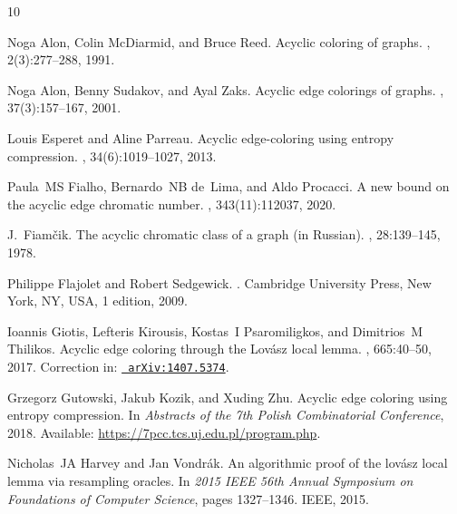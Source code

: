 \documentclass{amsart}
\theoremstyle{plain}
\begin{document}
%
%


\begin{thebibliography}{10}

Noga Alon, Colin McDiarmid, and Bruce Reed.
\newblock Acyclic coloring of graphs.
, 2(3):277--288, 1991.

Noga Alon, Benny Sudakov, and Ayal Zaks.
\newblock Acyclic edge colorings of graphs.
, 37(3):157--167, 2001.

Louis Esperet and Aline Parreau.
\newblock Acyclic edge-coloring using entropy compression.
, 34(6):1019--1027, 2013.

Paula~MS Fialho, Bernardo~NB de~Lima, and Aldo Procacci.
\newblock A new bound on the acyclic edge chromatic number.
, 343(11):112037, 2020.

J.~Fiam\v{c}ik.
\newblock The acyclic chromatic class of a graph (in {R}ussian).
, 28:139--145, 1978.

Philippe Flajolet and Robert Sedgewick.
.
\newblock Cambridge University Press, New York, NY, USA, 1 edition, 2009.

Ioannis Giotis, Lefteris Kirousis, Kostas~I Psaromiligkos, and Dimitrios~M
  Thilikos.
\newblock Acyclic edge coloring through the {L}ov{\'a}sz local lemma.
, 665:40--50, 2017.
\newblock Correction in: \href{http://arxiv.org/abs/1407.5374}{\tt
  arXiv:1407.5374}.

Grzegorz Gutowski, Jakub Kozik, and Xuding Zhu.
\newblock Acyclic edge coloring using entropy compression.
\newblock In {\em Abstracts of the 7th Polish Combinatorial Conference}, 2018.
\newblock Available:
  \href{https://7pcc.tcs.uj.edu.pl/program.php}{\url{https://7pcc.tcs.uj.edu.pl/program.php}}.

Nicholas~JA Harvey and Jan Vondr{\'a}k.
\newblock An algorithmic proof of the lov{\'a}sz local lemma via resampling
  oracles.
\newblock In {\em 2015 IEEE 56th Annual Symposium on Foundations of Computer
  Science}, pages 1327--1346. IEEE, 2015.


\end{thebibliography}
\end{document}
